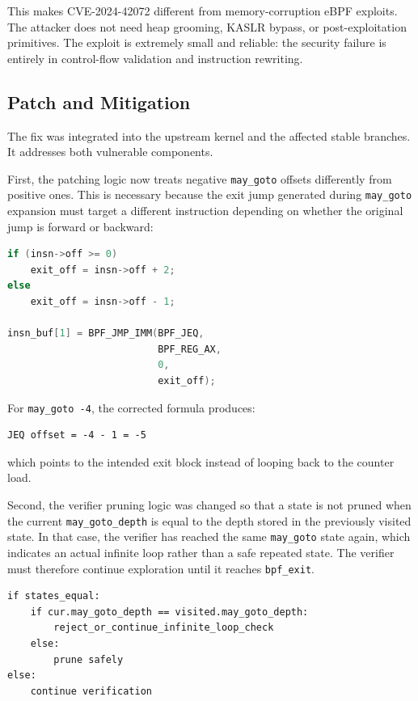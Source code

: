 \documentclass[../main.tex]{subfiles}
\begin{document}
This makes CVE-2024-42072 different from memory-corruption eBPF exploits. The attacker does not need heap grooming, KASLR bypass, or post-exploitation primitives. The exploit is extremely small and reliable: the security failure is entirely in control-flow validation and instruction rewriting.

\subsection{Patch and Mitigation}

The fix was integrated into the upstream kernel and the affected stable branches. It addresses both vulnerable components.

First, the patching logic now treats negative \texttt{may\_goto} offsets differently from positive ones. This is necessary because the exit jump generated during \texttt{may\_goto} expansion must target a different instruction depending on whether the original jump is forward or backward:

\begin{lstlisting}[language=C, caption={Conceptual corrected offset calculation.}]
if (insn->off >= 0)
    exit_off = insn->off + 2;
else
    exit_off = insn->off - 1;

insn_buf[1] = BPF_JMP_IMM(BPF_JEQ,
                          BPF_REG_AX,
                          0,
                          exit_off);
\end{lstlisting}

For \texttt{may\_goto -4}, the corrected formula produces:

\begin{lstlisting}
JEQ offset = -4 - 1 = -5
\end{lstlisting}

which points to the intended exit block instead of looping back to the counter load.

Second, the verifier pruning logic was changed so that a state is not pruned when the current \texttt{may\_goto\_depth} is equal to the depth stored in the previously visited state. In that case, the verifier has reached the same \texttt{may\_goto} state again, which indicates an actual infinite loop rather than a safe repeated state. The verifier must therefore continue exploration until it reaches \texttt{bpf\_exit}.

\begin{lstlisting}[caption={Conceptual model of the pruning fix.}]
if states_equal:
    if cur.may_goto_depth == visited.may_goto_depth:
        reject_or_continue_infinite_loop_check
    else:
        prune safely
else:
    continue verification
\end{lstlisting}
\end{document}
